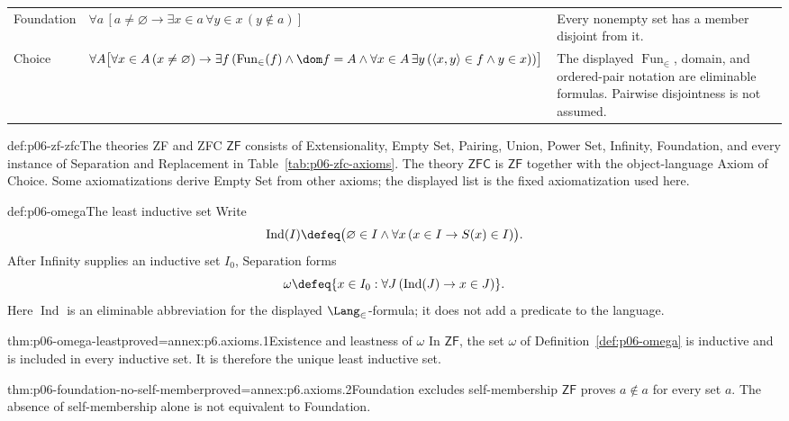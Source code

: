 \begin{longtable}{@{}p{}p{}p{}@{}}
\addlinespace
Foundation\index{axiom of foundation} &
\(\forall a\,[a\ne\varnothing\to
\exists x\in a\,\forall y\in x\,(y\notin a)]\) &
Every nonempty set has a member disjoint from it. \\
\addlinespace
Choice\index{Axiom of Choice} &
\(\displaystyle
\forall A\bigl[\forall x\in A\,(x\ne\varnothing)\to
\exists f\,(\operatorname{Fun}_{\in}(f)\land\dom f=A\land
\forall x\in A\,\exists y\,
(\langle x,y\rangle\in f\land y\in x))\bigr]\) &
The displayed \(\operatorname{Fun}_{\in}\), domain, and ordered-pair notation
are eliminable formulas.  Pairwise disjointness is not assumed. \\
\bottomrule
\end{longtable}
\endgroup

\begin{hbdefinition}{def:p06-zf-zfc}{The theories ZF and ZFC}
\(\mathsf{ZF}\) consists of Extensionality, Empty Set, Pairing, Union, Power
Set, Infinity, Foundation, and every instance of Separation and Replacement
in Table~\ref{tab:p06-zfc-axioms}.  The theory \(\mathsf{ZFC}\) is
\(\mathsf{ZF}\) together with the object-language Axiom of Choice.  Some
axiomatizations derive Empty Set from other axioms; the displayed list is the
fixed axiomatization used here.
\end{hbdefinition}

\begin{hbdefinition}{def:p06-omega}{The least inductive set}
Write
\[
 \operatorname{Ind}(I)\defeq
 \bigl(\varnothing\in I\land
       \forall x\,(x\in I\to S(x)\in I)\bigr).
\]
After Infinity supplies an inductive set \(I_0\), Separation forms
\[
 \omega\defeq
 \{x\in I_0:\forall J\,(\operatorname{Ind}(J)\to x\in J)\}.
\]
Here \(\operatorname{Ind}\) is an eliminable abbreviation for the displayed
\(\Lang_{\in}\)-formula; it does not add a predicate to the language.
\end{hbdefinition}

\begin{hbtheorem}{thm:p06-omega-least}{proved=annex:p6.axioms.1}{Existence and leastness of \(\omega\)}
In \(\mathsf{ZF}\), the set \(\omega\) of
Definition~\ref{def:p06-omega} is inductive and is included in every
inductive set.  It is therefore the unique least inductive set.
\end{hbtheorem}

\begin{hbcorollary}{thm:p06-foundation-no-self-member}{proved=annex:p6.axioms.2}{Foundation excludes self-membership}
\(\mathsf{ZF}\) proves \(a\notin a\) for every set \(a\).  The absence of
self-membership alone is not equivalent to Foundation.
\end{hbcorollary}

